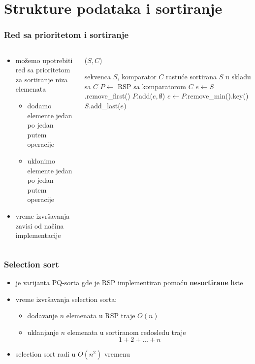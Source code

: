 \documentclass[compress]{beamer}
\begin{document}
\section[Sortiranje]{Strukture podataka i sortiranje}
\begin{frame}[fragile]
  \frametitle{Red sa prioritetom i sortiranje}
  \begin{columns}
    \begin{column}[c]{5cm}
      \begin{itemize}
        \item možemo upotrebiti red sa prioritetom za sortiranje niza elemenata
        \begin{itemize}
          \item dodamo elemente jedan po jedan putem  operacije
          \item uklonimo elemente jedan po jedan putem  operacije
        \end{itemize}
        \item vreme izvršavanja zavisi od načina implementacije
      \end{itemize}
    \end{column}
    \begin{column}[c]{6cm}
    ($S, C$)
    \begin{algorithmic}
      \REQUIRE sekvenca $S$, komparator $C$
      \ENSURE rastuće sortirana $S$ u skladu sa $C$
      \STATE $P \leftarrow$ RSP sa komparatorom $C$
        \STATE $e\leftarrow S$.remove\_first()
        \STATE $P$.add($e, \emptyset$)
      \ENDWHILE
        \STATE $e \leftarrow P$.remove\_min().key()
        \STATE $S$.add\_last($e$)
      \ENDWHILE
    \end{algorithmic}    
    \end{column}
  \end{columns}
\end{frame}

\begin{frame}[fragile]
  \frametitle{Selection sort}
  \begin{itemize}
    \item {} je varijanta PQ-sorta gde je RSP implementiran pomoću \textbf{nesortirane} liste
    \item vreme izvršavanja selection sorta:
    \begin{itemize}
      \item dodavanje $n$ elemenata u RSP traje $O(n)$
      \item uklanjanje $n$ elemenata u sortiranom redosledu traje \\
      $$1 + 2 + \ldots + n$$ 
    \end{itemize}
    \item selection sort radi u $O(n^2)$ vremenu
  \end{itemize}
\end{frame}
\end{document}
